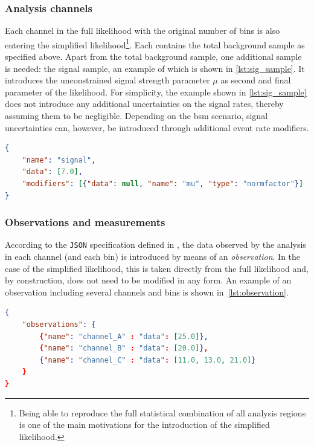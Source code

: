 \subsubsection{Analysis channels}

Each channel in the full likelihood with the original number of bins is also entering the simplified likelihood\footnote{Being able to reproduce the full statistical combination of all analysis regions is one of the main motivations for the introduction of the simplified likelihood.}. Each contains the total background sample as specified above.
Apart from the total background sample, one additional sample is needed: the signal sample, an example of which is shown in \cref{lst:sig_sample}.
It introduces the unconstrained signal strength parameter $\mu$ as second and final parameter of the likelihood.
For simplicity, the example shown in \cref{lst:sig_sample} does not introduce any additional uncertainties on the signal rates, thereby assuming them to be negligible. Depending on the \gls{bsm} scenario, signal uncertainties can, however, be introduced through additional event rate modifiers.

\begin{minipage}{\linewidth}
\begin{lstlisting}[language=json,firstnumber=1,caption={Example of a signal sample with sample rate and unconstrained normalisation parameter that will be used as \gls{poi}.},captionpos=b, label=lst:sig_sample]
{
	"name": "signal",
	"data": [7.0],
	"modifiers": [{"data": null, "name": "mu", "type": "normfactor"}]
}
\end{lstlisting}
\end{minipage}

\subsubsection{Observations and measurements}

According to the \texttt{JSON} specification defined in \cite{ATL-PHYS-PUB-2019-029}, the data observed by the analysis in each channel (and each bin) is introduced by means of an \textit{observation}. In the case of the simplified likelihood, this is taken directly from the full likelihood and, by construction, does not need to be modified in any form. An example of an observation including several channels and bins is shown in~\cref{lst:observation}.

\begin{minipage}{\linewidth}
\begin{lstlisting}[language=json,firstnumber=1,caption={Example of an observation in the simplified likelihood. It can be taken directly from the corresponding full likelihood. This example implements three channels, two with one bin, and one with three bins. The number of events observed in data are given for each channel and bin.},captionpos=b, label=lst:observation]
{
	"observations": {
		{"name": "channel_A" : "data": [25.0]},
		{"name": "channel_B" : "data": [20.0]},
		{"name": "channel_C" : "data": [11.0, 13.0, 21.0]}
	}	
}
\end{lstlisting}
\end{minipage}

